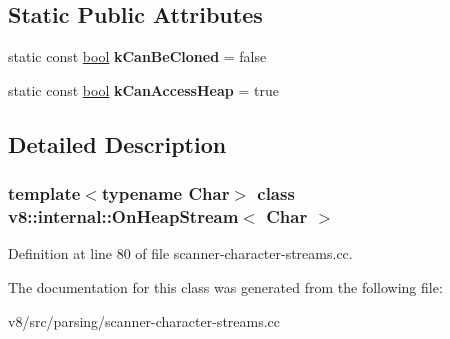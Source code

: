\subsection*{Static Public Attributes}
\begin{DoxyCompactItemize}
\item 
\mbox{\label{classv8_1_1internal_1_1OnHeapStream_a5a692bac465c22ad7e83875e41db8d77}} 
static const \mbox{\hyperlink{classbool}{bool}} {\bfseries k\+Can\+Be\+Cloned} = false
\item 
\mbox{\label{classv8_1_1internal_1_1OnHeapStream_ade83e6b5299407600dae4ae504710a69}} 
static const \mbox{\hyperlink{classbool}{bool}} {\bfseries k\+Can\+Access\+Heap} = true
\end{DoxyCompactItemize}


\subsection{Detailed Description}
\subsubsection*{template$<$typename Char$>$\newline
class v8\+::internal\+::\+On\+Heap\+Stream$<$ Char $>$}



Definition at line 80 of file scanner-\/character-\/streams.\+cc.



The documentation for this class was generated from the following file\+:\begin{DoxyCompactItemize}
\item 
v8/src/parsing/scanner-\/character-\/streams.\+cc\end{DoxyCompactItemize}
